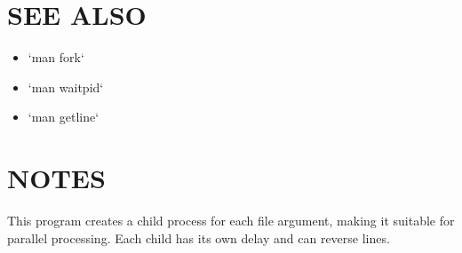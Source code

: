 \documentclass[11pt]{article}
\begin{document}
\section{SEE ALSO}
\label{sec:org9ef07e6}
\begin{itemize}
\item `man fork`
\item `man waitpid`
\item `man getline`
\end{itemize}
\section{NOTES}
\label{sec:org48f55be}
This program creates a child process for each file argument, making it suitable for parallel processing. Each child has its own delay and can reverse lines.
\end{document}
